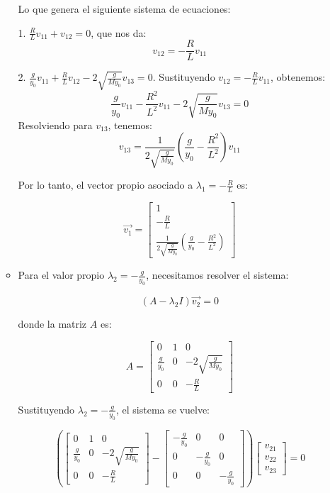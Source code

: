 \begin{enumerate}
\begin{itemize}
Lo que genera el siguiente sistema de ecuaciones:

1. \( \frac{R}{L}v_{11} + v_{12} = 0 \), que nos da:
   \[
   v_{12} = -\frac{R}{L}v_{11}
   \]
   
2. \( \frac{g}{y_0}v_{11} + \frac{R}{L}v_{12} - 2\sqrt{\frac{g}{M y_0}}v_{13} = 0 \). Sustituyendo \( v_{12} = -\frac{R}{L}v_{11} \), obtenemos:
   \[
   \frac{g}{y_0}v_{11} - \frac{R^2}{L^2}v_{11} - 2\sqrt{\frac{g}{M y_0}}v_{13} = 0
   \]
   Resolviendo para \( v_{13} \), tenemos:
   \[
   v_{13} = \frac{1}{2\sqrt{\frac{g}{M y_0}}} \left( \frac{g}{y_0} - \frac{R^2}{L^2} \right) v_{11}
   \]

Por lo tanto, el vector propio asociado a \( \lambda_1 = -\frac{R}{L} \) es:

\[
\Vec{v_1} = 
\begin{bmatrix}
1\\
-\frac{R}{L} \\
\frac{1}{2\sqrt{\frac{g}{M y_0}}} \left( \frac{g}{y_0} - \frac{R^2}{L^2} \right)
\end{bmatrix}
\]

\item Para el valor propio \( \lambda_2 = -\frac{g}{y_0} \), necesitamos resolver el sistema:

\[
(A - \lambda_2 I) \Vec{v_2} = 0
\]

donde la matriz \( A \) es:

\[
A = 
\begin{bmatrix}
0 & 1 & 0 \\
\frac{g}{y_0} & 0 & -2\sqrt{\frac{g}{M y_0}} \\
0 & 0 & -\frac{R}{L}
\end{bmatrix}
\]

Sustituyendo \( \lambda_2 = -\frac{g}{y_0} \), el sistema se vuelve:

\[
\left( 
\begin{bmatrix}
0 & 1 & 0 \\
\frac{g}{y_0} & 0 & -2\sqrt{\frac{g}{M y_0}} \\
0 & 0 & -\frac{R}{L}
\end{bmatrix}
- 
\begin{bmatrix}
-\frac{g}{y_0} & 0 & 0 \\
0 & -\frac{g}{y_0} & 0 \\
0 & 0 & -\frac{g}{y_0}
\end{bmatrix}
\right)
\begin{bmatrix}
v_{21} \\
v_{22} \\
v_{23}
\end{bmatrix}
= 0
\]


\end{itemize}
\end{enumerate}
